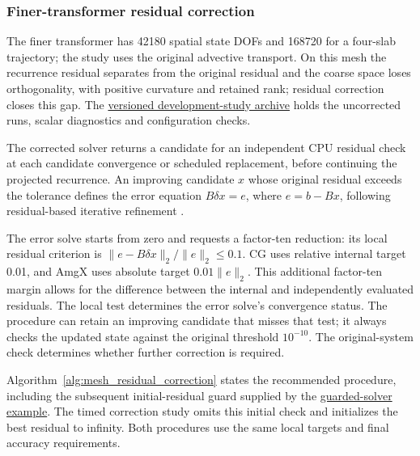 \subsubsection{Finer-transformer residual correction}
\label{si:mesh_refinement_diagnosis}
The finer transformer has 42180 spatial state DOFs and
168720 for a four-slab trajectory; the study uses the original advective
transport. On this mesh the recurrence residual separates from the original
residual and the coarse space loses orthogonality, with positive curvature and
retained rank; residual correction closes this gap. The
\href{https://github.com/teeratornk/deflation-example/tree/development-studies-v1/examples/development_studies}
{versioned development-study archive} holds the uncorrected runs,
scalar diagnostics and configuration checks.

The corrected solver returns a candidate for an independent CPU residual check
at each candidate convergence or scheduled replacement, before continuing
the projected recurrence. An improving candidate $x$ whose original residual
exceeds the tolerance defines
the error equation $B\delta x=e$, where $e=b-Bx$, following residual-based
iterative refinement \citep[Chapter~12]{higham2002accuracy}.

The error solve starts from zero and requests a factor-ten reduction:
its local residual criterion is
$\|e-B\delta x\|_2/\|e\|_2\leq0.1$.
CG uses relative internal target 0.01, and AmgX uses absolute target
$0.01\|e\|_2$. This additional factor-ten margin allows for the difference
between the internal and independently evaluated residuals.
The local test determines the error solve's convergence status. The procedure
can retain an improving candidate that misses that test; it always
checks the updated state against the original threshold $10^{-10}$.
The original-system check determines whether further correction is required.

Algorithm~\ref{alg:mesh_residual_correction} states the recommended procedure,
including the subsequent
initial-residual guard supplied by the
\href{https://github.com/teeratornk/deflation-example/blob/ba682dd05b168d2f43ff0c58050813deee785223/docs/mesh-showcases.md#use-the-recommended-guarded-solver}
{guarded-solver example}.
The timed correction study omits this initial check
and initializes the best residual to infinity. Both procedures use the
same local targets and final accuracy requirements.

